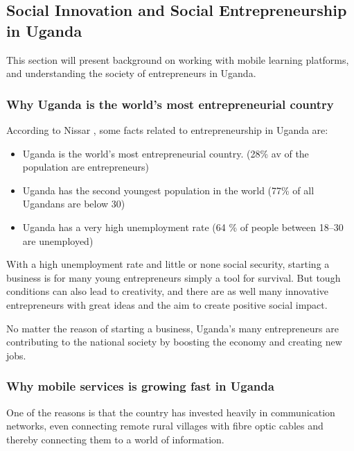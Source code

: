 \subsection{Social Innovation and Social Entrepreneurship in Uganda} %

    This section will present background on working with mobile learning platforms, and understanding the society of entrepreneurs in Uganda.

    \subsubsection{Why Uganda is the world's most entrepreneurial country}
    According to Nissar \citep{nissar}, some facts related to entrepreneurship in Uganda are:

    \begin{itemize}
      \item Uganda is the world's most entrepreneurial country. (28\% av of the population are entrepreneurs)
        \item Uganda has the second youngest population in the world (77\% of all Ugandans are below 30)
        \item Uganda has a very high unemployment rate (64 \% of people between 18–30 are unemployed)
    \end{itemize}


    With a high unemployment rate and little or none social security, starting a business is for many young entrepreneurs simply a tool for survival. But tough conditions can also lead to creativity, and there are as well many innovative entrepreneurs with great ideas and the aim to create positive social impact.

    No matter the reason of starting a business, Uganda's many entrepreneurs are contributing to the national society by boosting the economy and creating new jobs.

    \subsubsection{Why mobile services is growing fast in Uganda}
    One of the reasons is that the country has invested heavily in communication networks, even connecting remote rural villages with fibre optic cables and thereby connecting them to a world of information.

